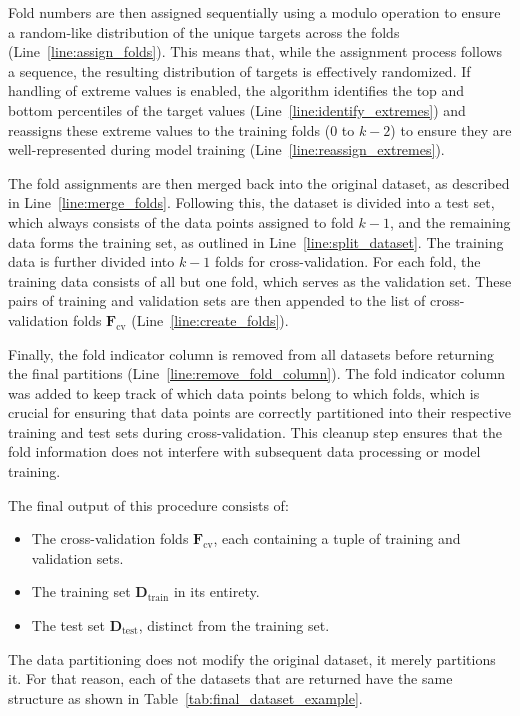 Fold numbers are then assigned sequentially using a modulo operation to ensure a random-like distribution of the unique targets across the folds (Line~\ref{line:assign_folds}).
This means that, while the assignment process follows a sequence, the resulting distribution of targets is effectively randomized.
If handling of extreme values is enabled, the algorithm identifies the top and bottom percentiles of the target values (Line~\ref{line:identify_extremes}) and reassigns these extreme values to the training folds (0 to \( k-2 \)) to ensure they are well-represented during model training (Line~\ref{line:reassign_extremes}).

The fold assignments are then merged back into the original dataset, as described in Line~\ref{line:merge_folds}.
Following this, the dataset is divided into a test set, which always consists of the data points assigned to fold \( k-1 \), and the remaining data forms the training set, as outlined in Line~\ref{line:split_dataset}.
The training data is further divided into \( k-1 \) folds for cross-validation.
For each fold, the training data consists of all but one fold, which serves as the validation set.
These pairs of training and validation sets are then appended to the list of cross-validation folds \(\mathbf{F}_\text{cv}\) (Line~\ref{line:create_folds}).

Finally, the fold indicator column is removed from all datasets before returning the final partitions (Line~\ref{line:remove_fold_column}).
The fold indicator column was added to keep track of which data points belong to which folds, which is crucial for ensuring that data points are correctly partitioned into their respective training and test sets during cross-validation. 
This cleanup step ensures that the fold information does not interfere with subsequent data processing or model training.

The final output of this procedure consists of:
\begin{itemize}
    \item The cross-validation folds \(\mathbf{F}_\text{cv}\), each containing a tuple of training and validation sets.
    \item The training set \(\mathbf{D}_\text{train}\) in its entirety.
    \item The test set \(\mathbf{D}_\text{test}\), distinct from the training set.
\end{itemize}

The data partitioning does not modify the original dataset, it merely partitions it.
For that reason, each of the datasets that are returned have the same structure as shown in Table~\ref{tab:final_dataset_example}.

